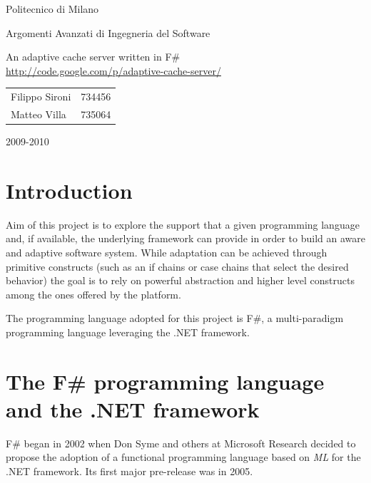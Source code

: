 \documentclass[11pt,a4paper]{article}
\begin{document}
\thispagestyle{empty}

\begin{center}
{\huge Politecnico di Milano}
\end{center}

\begin{center}
{\huge Argomenti Avanzati di Ingegneria del Software}
\end{center}

\vskip 8cm

\begin{center}
{\huge An adaptive cache server written in F\#}\\
\url{http://code.google.com/p/adaptive-cache-server/}
\end{center}

\vskip 2cm

\begin{center}
\begin{tabular}{ll}
{\large Filippo Sironi} & {\large 734456}\\
{\large Matteo Villa} & {\large 735064}\\
\end{tabular}
\end{center}

\vskip 2cm

\begin{center}
{\large 2009-2010}
\end{center}

\newpage

\section{Introduction}
\label{section:introduction}
Aim of this project is to explore the support that a given programming language and, if available, the underlying framework can provide in order to build an aware and adaptive software system.
While adaptation can be achieved through primitive constructs (such as an if chains or case chains that select the desired behavior) the goal is to rely on powerful abstraction and higher level constructs among the ones offered by the platform.

The programming language adopted for this project is F\#, a multi-paradigm programming language leveraging the .NET framework.

\section{The F\# programming language and the .NET framework}
\label{section:platform}
F\# began in 2002 when Don Syme and others at Microsoft Research decided to propose the adoption of a functional programming language based on \textit{ML} for the .NET framework. Its first major pre-release was in 2005.
\end{document}
